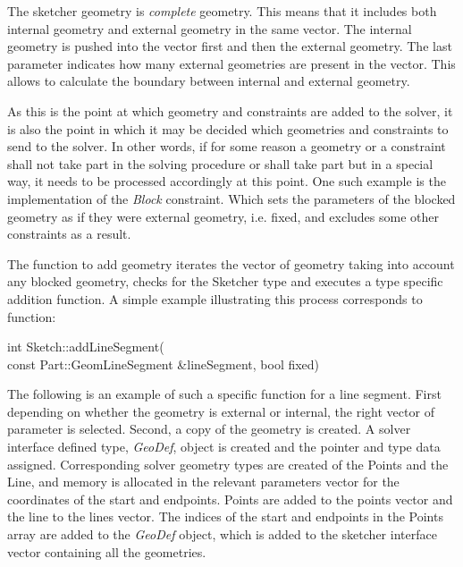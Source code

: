 \documentclass[12pt,twoside,a4paper]{book}
\begin{document}
    The sketcher geometry is \emph{complete} geometry. This means that it includes both internal geometry and external geometry in the same vector. The internal geometry is pushed into the vector first and then the external geometry. The last parameter indicates how many external geometries are present in the vector. This allows to calculate the boundary between internal and external geometry.

    As this is the point at which geometry and constraints are added to the solver, it is also the point in which it may be decided which geometries and constraints to send to the solver. In other words, if for some reason a geometry or a constraint shall not take part in the solving procedure or shall take part but in a special way, it needs to be processed accordingly at this point. One such example is the implementation of the \emph{Block} constraint. Which sets the parameters of the blocked geometry as if they were external geometry, i.e. fixed, and excludes some other constraints as a result.

    The function to add geometry iterates the vector of geometry taking into account any blocked geometry, checks for the Sketcher type and executes a type specific addition function. A simple example illustrating this process corresponds to function:

    \begin{codequote}
    int Sketch::addLineSegment(\\
    \-\hspace{0.75cm}const Part::GeomLineSegment \&lineSegment, bool fixed)
    \end{codequote}


    The following is an example of such a specific function for a line segment. First depending on whether the geometry is external or internal, the right vector of parameter is selected. Second, a copy of the geometry is created. A
    solver interface defined type, \emph{GeoDef}, object is created and the pointer and type data assigned. Corresponding solver geometry types are created of the Points and the Line, and memory is allocated in the relevant parameters vector for the coordinates of the start and endpoints. Points are added to the points vector and the line to the lines vector. The indices of the start and endpoints in the Points array are added to the \emph{GeoDef} object, which is added to the sketcher interface vector containing all the geometries.
\end{document}
